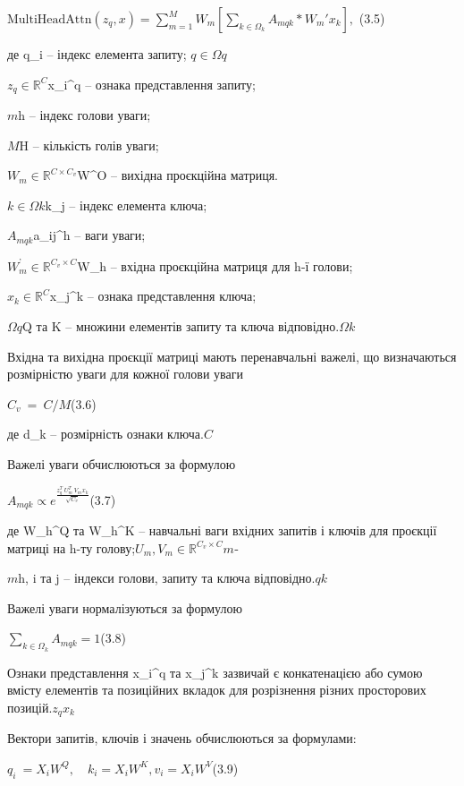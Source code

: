 \documentclass[
]{article}
\begin{document}
\(\text{MultiHeadAttn}\left( z_{q},x \right) = \sum_{m = 1}^{M}{W_{m}\left\lbrack \sum_{k \in \Omega_{k}}^{}A_{mqk}*W_{m}'x_{k} \right\rbrack},\) (3.5)

де q\_i -- індекс елемента запиту; \(q \in \Omega q\)

\(z_{q} \in \mathbb{R}^{C}\)x\_i\^{}q -- ознака представлення запиту;

\(m\)h -- індекс голови уваги;

\(M\)H -- кількість голів уваги;

\(W_{m} \in \mathbb{R}^{C \times C_{v}}\)W\^{}O -- вихідна проєкційна матриця.

\(k \in \Omega k\)k\_j -- індекс елемента ключа;

\(A_{mqk}\)a\_ij\^{}h -- ваги уваги;

\(W_{m}^{’} \in \mathbb{R}^{C_{v} \times C}\)W\_h -- вхідна проєкційна матриця для h-ї голови;

\(x_{k} \in \mathbb{R}^{C}\)x\_j\^{}k -- ознака представлення ключа;

\(\Omega q\)Q та K -- множини елементів запиту та ключа відповідно.\(\Omega k\)

Вхідна та вихідна проєкції матриці мають перенавчальні важелі, що визначаються розмірністю уваги для кожної голови уваги

\(C_{v}\  = \ C\text{/}M\)(3.6)

де d\_k -- розмірність ознаки ключа.\(C\)

Важелі уваги обчислюються за формулою

\(A_{mqk} \propto e^{\frac{z_{q}^{T}\ U_{m}^{T}\ V_{m}x_{k}}{\sqrt{C_{v}}}}\)(3.7)

де W\_h\^{}Q та W\_h\^{}K -- навчальні ваги вхідних запитів і ключів для проєкції матриці на h-ту голову;\(U_{m},V_{m} \in \mathbb{R}^{C_{v} \times C}m\)‑

\(m\)h, i та j -- індекси голови, запиту та ключа відповідно.\(qk\)

Важелі уваги нормалізуються за формулою

\(\sum_{k \in \Omega_{k}}^{}A_{mqk} = 1\)(3.8)

Ознаки представлення x\_i\^{}q та x\_j\^{}k зазвичай є конкатенацією або сумою вмісту елементів та позиційних вкладок для розрізнення різних просторових позицій.\(z_{q}x_{k}\)\-

Вектори запитів, ключів і значень обчислюються за формулами:

\(q_{i}\  = X_{i}W^{Q},\quad k_{i} = X_{i}W^{K},v_{i} = X_{i}W^{V}\)(3.9)
\end{document}
